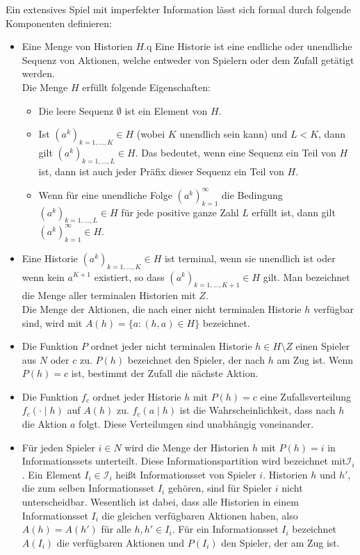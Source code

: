 Ein extensives Spiel mit imperfekter Information lässt sich formal durch folgende Komponenten definieren:
\begin{itemize}
  \item Eine Menge von Historien $H$.q
  Eine Historie ist eine endliche oder unendliche Sequenz von Aktionen, welche entweder von Spielern oder dem Zufall getätigt werden.\\
  Die Menge $H$ erfüllt folgende Eigenschaften:
  \begin{itemize}
    \item Die leere Sequenz $\emptyset$ ist ein Element von $H$.
    \item Ist $(a^k)_{k=1,\dots,K} \in H$ (wobei $K$ unendlich sein kann) und $L < K$, dann gilt $(a^k)_{k=1,\dots,L} \in H$.
    Das bedeutet, wenn eine Sequenz ein Teil von $H$ ist, dann ist auch jeder Präfix dieser Sequenz ein Teil von $H$.
    \item Wenn für eine unendliche Folge $(a^k)_{k=1}^\infty$ die Bedingung $(a^k)_{k=1,\dots,L} \in H$ für jede positive ganze Zahl $L$ erfüllt ist, dann gilt $(a^k)_{k=1}^\infty \in H$.
  \end{itemize}
  \item Eine Historie $(a^k)_{k=1,\dots,K} \in H$ ist terminal, wenn sie unendlich ist oder wenn kein $a^{K+1}$ existiert, so dass $(a^k)_{k=1,\dots,K+1} \in H$ gilt. 
  Man bezeichnet die Menge aller terminalen Historien mit $Z$.\\
  Die Menge der Aktionen, die nach einer nicht terminalen Historie $h$ verfügbar sind, wird mit $A(h) = \{a : (h,a) \in H\}$ bezeichnet.
  
  \item Die Funktion $P$ ordnet jeder nicht terminalen Historie $h \in H \setminus Z$ einen Spieler aus $N$ oder $c$ zu.
  $P(h)$ bezeichnet den Spieler, der nach $h$ am Zug ist. 
  Wenn $P(h) = c$ ist, bestimmt der Zufall die nächste Aktion.
  
  \item Die Funktion $f_c$ ordnet jeder Historie $h$ mit $P(h) = c$ eine Zufallsverteilung $f_c(\cdot \mid h)$ auf $A(h)$ zu.
  $f_c(a \mid h)$ ist die Wahrscheinlichkeit, dass nach $h$ die Aktion $a$ folgt. 
  Diese Verteilungen sind unabhängig voneinander.

  \item Für jeden Spieler $i \in N$ wird die Menge der Historien $h$ mit $P(h)=i$ in Informationssets unterteilt.
  Diese Informationspartition wird bezeichnet mit$\mathcal{I}_i$.
  Ein Element $I_i \in \mathcal{I}_i$ heißt Informationsset von Spieler $i$.
  Historien $h$ und $h'$, die zum selben Informationsset $I_i$ gehören, sind für Spieler $i$ nicht unterscheidbar.
  Wesentlich ist dabei, dass alle Historien in einem Informationsset $I_i$ die gleichen verfügbaren Aktionen haben, also $A(h) = A(h')$ für alle $h, h' \in I_i$. 
  Für ein Informationsset $I_i$ bezeichnet $A(I_i)$ die verfügbaren Aktionen und $P(I_i)$ den Spieler, der am Zug ist.


\end{itemize}
